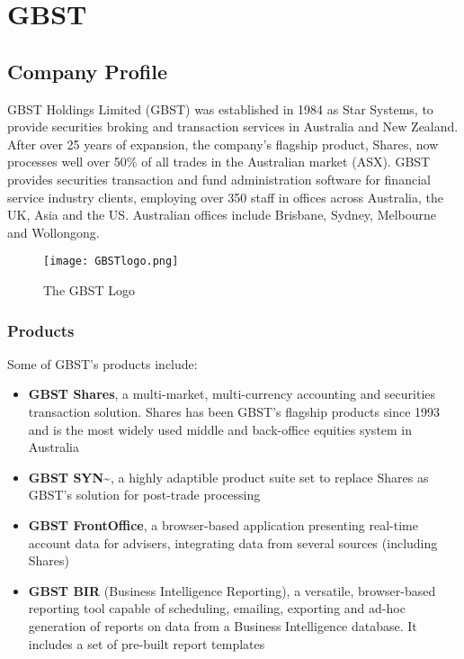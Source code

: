 \chapter{GBST}

\section{Company Profile}

GBST Holdings Limited (GBST) was established in 1984 as Star Systems, to provide securities broking and transaction services in Australia and New Zealand. After over 25 years of expansion, the company's flagship product, Shares, now processes well over 50\% of all trades in the Australian market (ASX). \cite{gbsthistory} GBST provides securities transaction and fund administration software for financial service industry clients, employing over 350 staff in offices across Australia, the UK, Asia and the US. Australian offices include Brisbane, Sydney, Melbourne and Wollongong. 
\vspace{0.5cm}
\begin{figure}[ht!]
\centering
\texttt{[image: GBSTlogo.png]}
\caption{The GBST Logo \cite{gbstlogo}}
\label{gbstlogo}
\end{figure}

\subsection{Products}

Some of GBST's products include:

\begin{itemize}
\item \textbf{GBST Shares\texttrademark}, a multi-market, multi-currency accounting and securities transaction solution. Shares has been GBST's flagship products since 1993 and is the most widely used middle and back-office equities system in Australia \cite{gbstshares}
\item \textbf{GBST SYN\~}, a highly adaptible product suite set to replace Shares as GBST's solution for post-trade processing \cite{gbstsyn}
\item \textbf{GBST FrontOffice\texttrademark}, a browser-based application presenting real-time account data for advisers, integrating data from several sources (including Shares) \cite{gbstfrontoffice}
\item \textbf{GBST BIR\texttrademark} (Business Intelligence Reporting), a versatile, browser-based reporting tool capable of scheduling, emailing, exporting and ad-hoc generation of reports on data from a Business Intelligence database. \cite{gbstbir} It includes a set of pre-built report templates 
\end{itemize}

